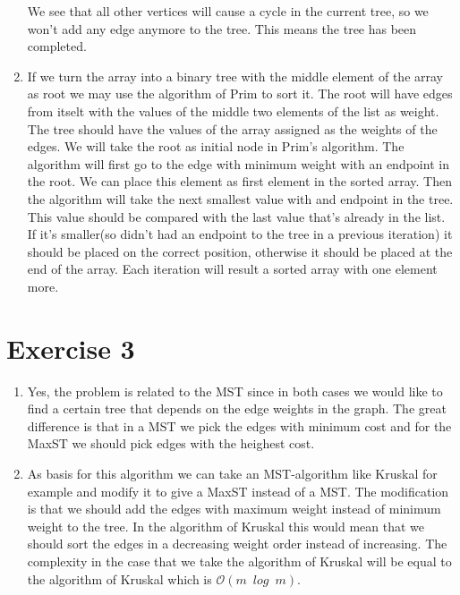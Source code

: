 \documentclass{article}
\newcommand{\bigO}{\mathcal{O}}
\begin{document}
\begin{enumerate}
\begin{center}
\end{center}

We see that all other vertices will cause a cycle in the current tree, so we won't add any edge anymore to the tree. This means the tree has been completed.
\item If we turn the array into a binary tree with the middle element of the array as root we may use the algorithm of Prim to sort it. The root will have edges from itselt with the values of the middle two elements of the list as weight. The tree should have the values of the array assigned as the weights of the edges. We will take the root as initial node in Prim's algorithm. The algorithm will first go to the edge with minimum weight with an endpoint in the root. We can place this element as first element in the sorted array. Then the algorithm will take the next smallest value with and endpoint in the tree. This value should be compared with the last value that's already in the list. If it's smaller(so didn't had an endpoint to the tree in a previous iteration) it should be placed on the correct position, otherwise it should be placed at the end of the array. Each iteration will result a sorted array with one element more.

\end{enumerate}

\section*{Exercise 3}
\begin{enumerate}
  \item Yes, the problem is related to the MST since in both cases we would like to find a certain tree that depends on the edge weights in the graph. The great difference is that in a MST we pick the edges with minimum cost and for the MaxST we should pick edges with the heighest cost.
  \item As basis for this algorithm we can take an MST-algorithm like Kruskal for example and modify it to give a MaxST instead of a MST. The modification is that we should add the edges with maximum weight instead of minimum weight to the tree. In the algorithm of Kruskal this would mean that we should sort the edges in a decreasing weight order instead of increasing. The complexity in the case that we take the algorithm of Kruskal will be equal to the algorithm of Kruskal which is $\bigO (m \enspace log \enspace m)$.
\end{enumerate}
\end{document}
